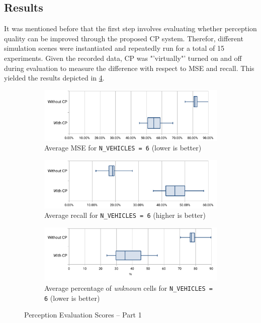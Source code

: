 \subsection{Results}
\label{subsec:evaluation:perception_evaluation:results}
It was mentioned before that the first step involves evaluating whether perception quality can be improved through the proposed CP system. Therefor, different simulation scenes were instantiated and repeatedly run for a total of 15 experiments. Given the recorded data, CP was "'virtually"' turned on and off during evaluation to measure the difference with respect to MSE and recall. This yielded the results depicted in \cref{fig:perception_evalutation_scores_1}.

\begin{figure}
	\centering
	\begin{subfigure}[b]{1\textwidth}
		\includegraphics[width=1\linewidth]{98_images/eval_boxplot_2}
		\caption{Average MSE for \texttt{N\_VEHICLES = 6} (lower is better)}
		\label{fig:eval_boxplot_2} 
	\end{subfigure}
	
	\begin{subfigure}[b]{1\textwidth}
		\includegraphics[width=1\linewidth]{98_images/eval_boxplot_3}
		\caption{Average recall for \texttt{N\_VEHICLES = 6} (higher is better)}
		\label{fig:eval_boxplot_3}
	\end{subfigure}

	\begin{subfigure}[b]{1\textwidth}
		\includegraphics[width=1\linewidth]{98_images/eval_boxplot_1}
		\caption{Average percentage of \textit{unknown} cells for \texttt{N\_VEHICLES = 6} (lower is better)}
		\label{fig:eval_boxplot_1}
	\end{subfigure}
	\caption{Perception Evaluation Scores – Part 1}
	\label{fig:perception_evalutation_scores_1}
\end{figure}

